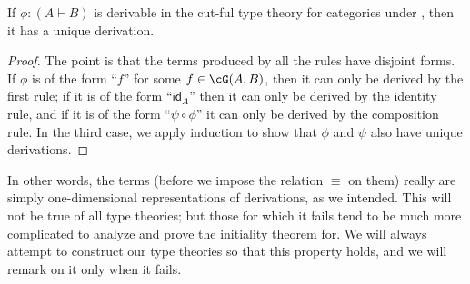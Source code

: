 \documentclass{book}
\def\idfunc{\mathsf{id}}
\let\types\vdash
\begin{document}
\begin{lem}\label{thm:category-uniqderiv}
  If $\phi :(A\types B)$ is derivable in the cut-ful type theory for categories under \cG, then it has a unique derivation.
\end{lem}
\begin{proof}
  The point is that the terms produced by all the rules have disjoint forms.
  If $\phi$ is of the form ``$f$'' for some $f\in\cG(A,B)$, then it can only be derived by the first rule; if it is of the form ``$\idfunc_A$'' then it can only be derived by the identity rule, and if it is of the form ``$\psi\circ\phi$'' it can only be derived by the composition rule.
  In the third case, we apply induction to show that $\phi$ and $\psi$ also have unique derivations.
\end{proof}

In other words, the terms (before we impose the relation $\equiv$ on them) really are simply one-dimensional representations of derivations, as we intended.
This will not be true of all type theories; but those for which it fails tend to be much more complicated to analyze and prove the initiality theorem for.
We will always attempt to construct our type theories so that this property holds, and we will remark on it only when it fails.
\end{document}
